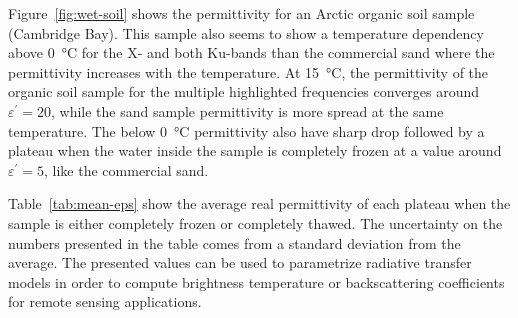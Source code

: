 Figure~\ref{fig:wet-soil} shows the permittivity for an Arctic organic soil sample (Cambridge Bay).
This sample also seems to show a temperature dependency above \qty{0}{\degreeCelsius} for the X- and both Ku-bands than the commercial sand where the permittivity increases with the temperature.
At \qty{15}{\degreeCelsius}, the permittivity of the organic soil sample for the multiple highlighted frequencies converges around \(\varepsilon^\prime = 20\), while the sand sample permittivity is more spread at the same temperature.
The below \qty{0}{\degreeCelsius} permittivity also have sharp drop followed by a plateau when the water inside the sample is completely frozen at a value around \(\varepsilon^\prime = 5\), like the commercial sand.

Table~\ref{tab:mean-eps} show the average real permittivity of each plateau when the sample is either completely frozen or completely thawed.
The uncertainty on the numbers presented in the table comes from a standard deviation from the average.
The presented values can be used to parametrize radiative transfer models in order to compute brightness temperature or backscattering coefficients for remote sensing applications.

\begin{table}[ht!]
\centering
\caption{Mean real permittivity of the frozen (T\(\leq\)\qty{-0.5}{\degreeCelsius}) and thawed (T\(\geq\)\qty{0.5}{\degreeCelsius}) sample for each relevant band frequencies}\label{tab:mean-eps}%
\end{table}

